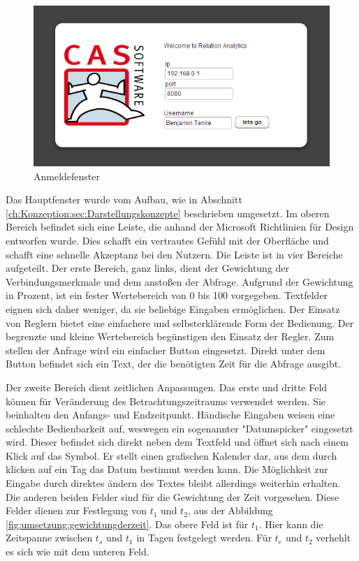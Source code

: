 \begin{figure}[htbp]
\centering
\includegraphics[scale=2.0]{pics/login.png}
\caption{Anmeldefenster}
\label{ergebniss_oberflaeche_anmeld}
\end{figure}

Das Hauptfenster wurde vom Aufbau, wie in Abschnitt \ref{ch:Konzeption:sec:Darstellungskonzepte} beschrieben umgesetzt. Im oberen Bereich befindet sich eine Leiste, die anhand der Microsoft Richtlinien für Design entworfen wurde. Dies schafft ein vertrautes Gefühl mit der Oberfläche und schafft eine schnelle Akzeptanz bei den Nutzern. Die Leiste ist in vier Bereiche aufgeteilt. Der erste Bereich, ganz links, dient der Gewichtung der Verbindungsmerkmale und dem anstoßen der Abfrage. Aufgrund der Gewichtung in Prozent, ist ein fester Wertebereich von 0 bis 100 vorgegeben. Textfelder eignen sich daher weniger, da sie beliebige Eingaben ermöglichen. Der Einsatz von Reglern bietet eine einfachere und selbsterklärende Form der Bedienung. Der begrenzte und kleine Wertebereich begünstigen den Einsatz der Regler. Zum stellen der Anfrage wird ein einfacher Button eingesetzt. Direkt unter dem Button befindet sich ein Text, der die benötigten Zeit für die Abfrage ausgibt. 

Der zweite Bereich dient zeitlichen Anpassungen. Das erste und dritte Feld können für Veränderung des Betrachtungszeitraums verwendet werden. Sie beinhalten den Anfangs- und Endzeitpunkt. Händische Eingaben weisen eine schlechte Bedienbarkeit auf, weswegen ein sogenannter "Datumspicker" eingesetzt wird. Dieser befindet sich direkt neben dem Textfeld und öffnet sich nach einem Klick auf das Symbol. Er stellt einen grafischen Kalender dar, aus dem durch klicken auf ein Tag das Datum bestimmt werden kann. Die Möglichkeit zur Eingabe durch direktes ändern des Textes bleibt allerdings weiterhin erhalten. Die anderen beiden Felder sind für die Gewichtung der Zeit vorgesehen. Diese Felder dienen zur Festlegung von $t_1$ und $t_2$, aus der Abbildung \ref{fig:umsetzung:gewichtungderzeit}. Das obere Feld ist für $t_1$. Hier kann die Zeitspanne zwischen $t_{s}$ und $t_1$ in Tagen festgelegt werden. Für $t_{e}$ und $t_2$ verhehlt es sich wie mit dem unteren Feld.

